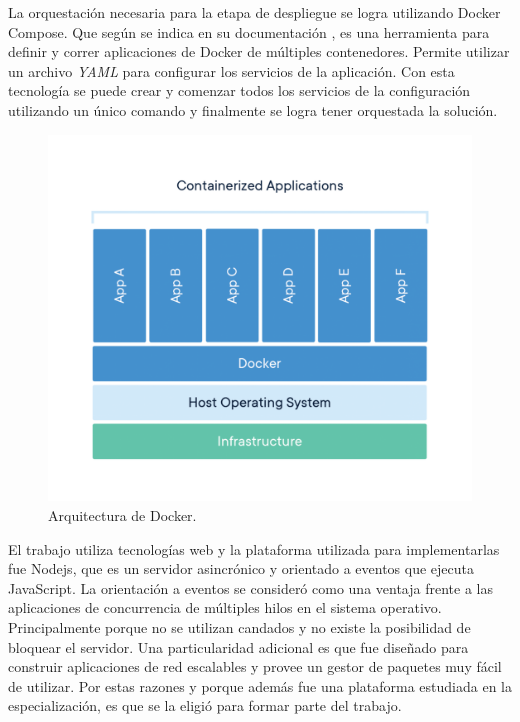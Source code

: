 La orquestación necesaria para la etapa de despliegue se logra utilizando Docker Compose.
Que según se indica en su documentación \citep{WEBSITE:WhatDockerCompose}, es una herramienta para definir y correr aplicaciones de Docker de múltiples contenedores.
Permite utilizar un archivo \emph{YAML} para configurar los servicios de la aplicación.
Con esta tecnología se puede crear y comenzar todos los servicios de la configuración utilizando un único comando y finalmente se logra tener orquestada la solución.

\begin{figure}[h]
	\centering
	\includegraphics[width=\textwidth]{./Figures/ch2DockerContainer.png}
	\caption{Arquitectura de Docker. \citep{WEBSITE:WhatContainer}}
	\label{fig:ch2WhatContainer}
\end{figure}

El trabajo utiliza tecnologías web y la plataforma utilizada para implementarlas fue Nodejs, que es un servidor asincrónico y orientado a eventos que ejecuta JavaScript.
La orientación a eventos se consideró como una ventaja frente a las aplicaciones de concurrencia de múltiples hilos en el sistema operativo.
Principalmente porque no se utilizan candados y no existe la posibilidad de bloquear el servidor.
Una particularidad adicional es que fue diseñado para construir aplicaciones de red escalables y provee un gestor de paquetes muy fácil de utilizar.
Por estas razones y porque además fue una plataforma estudiada en la especialización, es que se la eligió para formar parte del trabajo.

